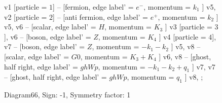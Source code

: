\documentclass{revtex4}
\begin{document}
\begin{figure}[!htb]
\begin{center}
{    %
v1 [particle = \(1\)] -- [fermion, edge label' = \(e^{-}\), momentum = \(k_{1}\) ] v5, 
v2 [particle = \(2\)] -- [anti fermion, edge label' = \(e^{+}\), momentum = \(k_{2}\) ] v5, 
v6 -- [scalar, edge label' = \(H\), momentum = \(K_{3}\) ] v3 [particle = \(3\)], 
v6 -- [boson, edge label' = \(Z\), momentum = \(K_{4}\) ] v4 [particle = \(4\)], 
v7 -- [boson, edge label' = \(Z\), momentum = \(-k_{1} - k_{2}\) ] v5, 
v8 -- [scalar, edge label' = \(G0\), momentum = \(K_{3} + K_{4}\) ] v6, 
v8 -- [ghost, half right, edge label' = \(ghWp\), momentum = \(-k_{1} - k_{2} + q_{1}\) ] v7, 
v7 -- [ghost, half right, edge label' = \(ghWp\), momentum = \(q_{1}\) ] v8, 
};
\end{center}
\caption{Diagram66, Sign: -1, Symmetry factor: 1}
\end{figure}
\newpage
\end{document}
